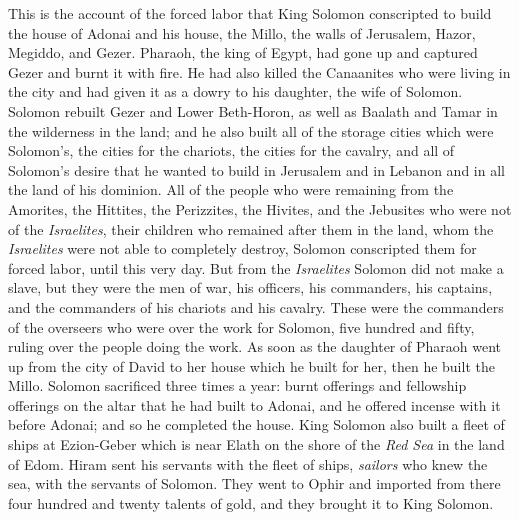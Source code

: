 \begin{biblechapter}
 This is the account of the forced labor that King Solomon conscripted to build the house of Adonai and his house, the Millo, the walls of Jerusalem, Hazor, Megiddo, and Gezer.
\verse Pharaoh, the king of Egypt, had gone up and captured Gezer and burnt it with fire. He had also killed the Canaanites who were living in the city and had given it as a dowry to his daughter, the wife of Solomon.
\verse Solomon rebuilt Gezer and Lower Beth-Horon,
\verse as well as Baalath and Tamar in the wilderness in the land;
\verse and he also built all of the storage cities which were Solomon’s, the cities for the chariots, the cities for the cavalry, and all of Solomon’s desire that he wanted to build in Jerusalem and in Lebanon and in all the land of his dominion.
\verse All of the people who were remaining from the Amorites, the Hittites, the Perizzites, the Hivites, and the Jebusites who were not of the \textit{Israelites},
\verse their children who remained after them in the land, whom the \textit{Israelites} were not able to completely destroy, Solomon conscripted them for forced labor, until this very day.
\verse But from the \textit{Israelites} Solomon did not make a slave, but they were the men of war, his officers, his commanders, his captains, and the commanders of his chariots and his cavalry.
\verse These were the commanders of the overseers who were over the work for Solomon, five hundred and fifty, ruling over the people doing the work.
\verse As soon as the daughter of Pharaoh went up from the city of David to her house which he built for her, then he built the Millo.
\verse Solomon sacrificed three times a year: burnt offerings and fellowship offerings on the altar that he had built to Adonai, and he offered incense with it before Adonai; and so he completed the house.
\verse King Solomon also built a fleet of ships at Ezion-Geber which is near Elath on the shore of the \textit{Red Sea} in the land of Edom.
\verse Hiram sent his servants with the fleet of ships, \textit{sailors} who knew the sea, with the servants of Solomon.
\verse They went to Ophir and imported from there four hundred and twenty talents of gold, and they brought it to King Solomon.
\end{biblechapter}

